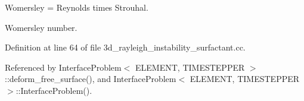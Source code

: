 Womersley = Reynolds times Strouhal. 

Womersley number. 

Definition at line 64 of file 3d\+\_\+rayleigh\+\_\+instability\+\_\+surfactant.\+cc.



Referenced by Interface\+Problem$<$ E\+L\+E\+M\+E\+N\+T, T\+I\+M\+E\+S\+T\+E\+P\+P\+E\+R $>$\+::deform\+\_\+free\+\_\+surface(), and Interface\+Problem$<$ E\+L\+E\+M\+E\+N\+T, T\+I\+M\+E\+S\+T\+E\+P\+P\+E\+R $>$\+::\+Interface\+Problem().

